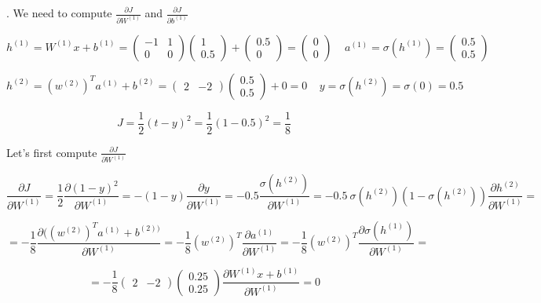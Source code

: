 \newpage
{}. We need to compute $ \frac{\partial J}{\partial W^{(1)}}$ and $\frac{\partial J}{\partial b^{(1)}} $


$$ h^{(1)} = W^{(1)}x + b^{(1)} = \begin{pmatrix} -1 & 1 \\ 0 & 0 \end{pmatrix} \begin{pmatrix} 1 \\ 0.5 \end{pmatrix} + \begin{pmatrix} 0.5 \\ 0 \end{pmatrix} = \begin{pmatrix} 0 \\ 0 \end{pmatrix} ~~~~~  a^{(1)} = \sigma(h^{(1)}) = \begin{pmatrix} 0.5 \\ 0.5 \end{pmatrix} $$


$$ h^{(2)} = (w^{(2)})^T a^{(1)} + b^{(2)} = \begin{pmatrix} 2 & -2 \end{pmatrix} \begin{pmatrix} 0.5 \\ 0.5 \end{pmatrix} + 0 = 0  ~~~~~ y = \sigma(h^{(2)}) = \sigma(0) = 0.5 $$

$$ J = \frac{1}{2} (t - y)^2 = \frac{1}{2} (1 - 0.5)^2 = \frac{1}{8} $$

\noindent Let's first compute $\frac{\partial J}{\partial W^{(1)}}$

$$ \frac{\partial J}{\partial W^{(1)}} = \frac{1}{2} \frac{\partial (1 - y)^2}{\partial W^{(1)}} = 
-(1 - y) \frac{\partial y}{\partial W^{(1)}} = -0.5 \frac{\sigma(h^{(2)})}{\partial W^{(1)}} = -0.5~  \sigma(h^{(2)}) (1 - \sigma(h^{(2)})) \frac{ \partial h^{(2)} }{\partial W^{(1)}} =  $$

$$ = -\frac{1}{8} \frac{\partial ( (w^{(2)})^T a^{(1)} + b^{(2) ) }}{\partial W^{(1)}} =  -\frac{1}{8}(w^{(2)})^T \frac{\partial a^{(1)}}{\partial W^{(1)}} = -\frac{1}{8}(w^{(2)})^T \frac{\partial \sigma (h^{(1)})}{\partial W^{(1)}} =  $$

$$ = -\frac{1}{8} \begin{pmatrix}  2 & -2 \end{pmatrix} \begin{pmatrix} 0.25 \\ 0.25 \end{pmatrix}  \frac{\partial W^{(1)}x + b^{(1)}}{\partial W^{(1)}} = 0 $$

